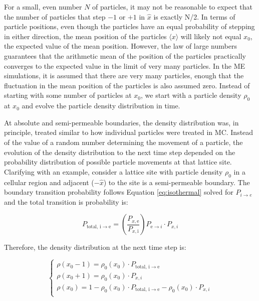 	For a small, even number $ N $ of particles, it may not be reasonable to expect that the number of particles that step $ -1 $ or $ +1 $ in $ \hat{x} $ is exactly N/2. In terms of particle positions, even though the particles have an equal probability of stepping in either direction, the mean position of the particles $ \langle x \rangle $ will likely not equal $ x_0 $, the expected value of the mean position. However, the law of large numbers guarantees that the arithmetic mean of the position of the particles practically converges to the expected value in the limit of very many particles. In the ME simulations, it is assumed that there are very many particles, enough that the fluctuation in the mean position of the particles is also assumed zero. Instead of starting with some number of particles at $ x_0 $, we start with a particle density $ \rho_0 $ at $ x_0 $ and evolve the particle density distribution in time. %
	
	At absolute and semi-permeable boundaries, the density distribution was, in principle, treated similar to how individual particles were treated in MC. Instead of the value of a random number determining the movement of a particle, the evolution of the density distribution to the next time step depended on the probability distribution of possible particle movements at that lattice site. Clarifying with an example, consider a lattice site with particle density $ \rho_0 $ in a cellular region and adjacent ($ -\hat{x} $) to the site is a semi-permeable boundary. The boundary transition probability follows Equation \ref{eq:isothermal} solved for $ P_{i \rightarrow e} $ and the total transition is probability is:
	
	\begin{equation}
		P_{\textrm{total},\, \textrm{i} \rightarrow \textrm{e}} = \left( \dfrac{P_{x,\textrm{e}}}{P_{x,\textrm{i}}}\right)  P_{\textrm{e}\rightarrow i} \cdot P_{x,i}
	\end{equation}	
	
	Therefore, the density distribution at the next time step is:
	
	\[   \left\{
	\begin{array}{l}
	      \rho(x_0 - 1) =   \rho_0(x_0) \cdot P_{\textrm{total},\, \textrm{i} \rightarrow \textrm{e}} \\
	      \rho(x_0 + 1) =   \rho_0(x_0) \cdot P_{x,i} \\
	      \rho(x_0) =   1 - \rho_0(x_0) \cdot P_{\textrm{total},\, \textrm{i} \rightarrow \textrm{e}} -  \rho_0(x_0) \cdot P_{x,i}\\
	\end{array} 
	\right. \]	
	
